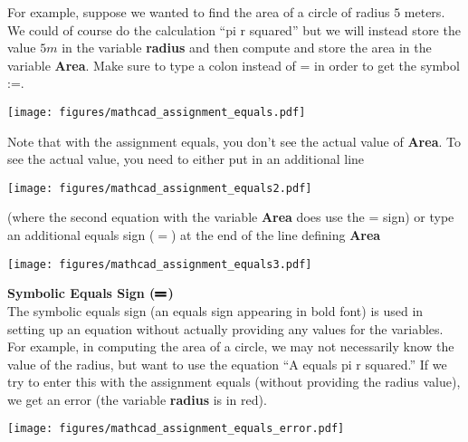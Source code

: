For example, suppose we wanted to find the area of a circle of radius $5$ meters.  We could of course do the calculation ``pi r squared'' but we will instead store the value $5m$ in the variable {\bf radius} and then compute and store the area in the variable {\bf Area}.  Make sure to type a colon instead of = in order to get the symbol :=.

\begin{center}
\texttt{[image: figures/mathcad\_assignment\_equals.pdf]} %
\end{center}

Note that with the assignment equals, you don't see the actual value of {\bf Area}.  To see the actual value, you need to either put in an additional line

\begin{center}
\texttt{[image: figures/mathcad\_assignment\_equals2.pdf]} %
\end{center}

(where the second equation with the variable {\bf Area} does use the = sign) or type an additional equals sign ($=$) at the end of the line defining {\bf Area}

\begin{center}
\texttt{[image: figures/mathcad\_assignment\_equals3.pdf]} %
\end{center}

\noindent \large \textsf{\textbf{Symbolic Equals Sign ($\raisebox{1pt}{\rule{9pt}{1.5pt}}\hskip-9pt\raisebox{3.5pt}{\rule{9pt}{1.5pt}}$)}} \normalsize\\

The symbolic equals sign (an equals sign appearing in bold font) is used in setting up an equation without actually providing any values for the variables.  For example, in computing the area of a circle, we may not necessarily know the value of the radius, but want to use the equation ``A equals pi r squared.''  If we try to enter this with the assignment equals (without providing the radius value), we get an error (the variable {\bf radius} is in red).

\begin{center}
\texttt{[image: figures/mathcad\_assignment\_equals\_error.pdf]} %
\end{center}

